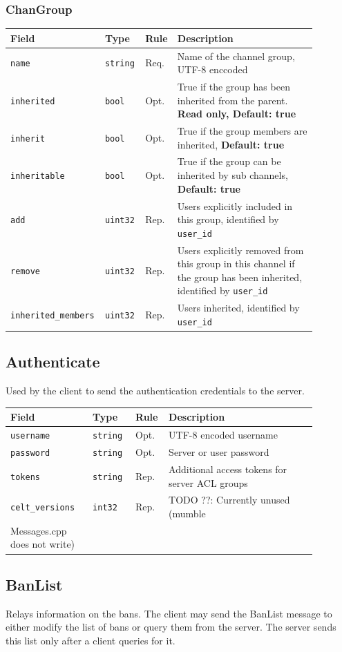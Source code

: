 \documentclass[11pt]{article} %
\newenvironment{mumbleMessageEx}
{%
	\small
	\renewcommand\arraystretch{1.5}
	\begin{tabular}{p{0.25\linewidth}p{0.13\linewidth}p{0.05\linewidth}p{0.45\linewidth}}
	Field & Type & Rule & Description \\
	\hline
}
{%
	\end{tabular}
	\renewcommand\arraystretch{1.0}
}
\newcommand{\mumbleMessageExItem}[4]{ \texttt{#1} & \texttt{#2} & #3 & #4 \\ }
\begin{document}
\subsubsection{ChanGroup}
\label{msg:chanGroup}

\begin{mumbleMessageEx}
\mumbleMessageExItem{name}{string}{Req.}{Name of the channel group, UTF-8 enccoded}
\mumbleMessageExItem{inherited}{bool}{Opt.}{True if the group has been inherited from the parent. \textbf{Read only, Default: true}}
\mumbleMessageExItem{inherit}{bool}{Opt.}{True if the group members are inherited, \textbf{Default: true}}
\mumbleMessageExItem{inheritable}{bool}{Opt.}{True if the group can be inherited by sub channels, \textbf{Default: true}}
\mumbleMessageExItem{add}{uint32}{Rep.}{Users explicitly included in this group, identified by \texttt{user\_id}}
\mumbleMessageExItem{remove}{uint32}{Rep.}{Users explicitly removed from this group in this channel if the group has been inherited, identified by \texttt{user\_id}}
\mumbleMessageExItem{inherited\_members}{uint32}{Rep.}{Users inherited, identified by \texttt{user\_id}}
\end{mumbleMessageEx}


\subsection{Authenticate}
\label{msg:authenticate}

Used by the client to send the authentication credentials to the server.

\begin{mumbleMessageEx}
\mumbleMessageExItem{username}{string}{Opt.}{UTF-8 encoded username}
\mumbleMessageExItem{password}{string}{Opt.}{Server or user password}
\mumbleMessageExItem{tokens}{string}{Rep.}{Additional access tokens for server ACL groups}
\mumbleMessageExItem{celt\_versions}{int32}{Rep.}{TODO ??: Currently unused (mumble\\Messages.cpp does not write)}
\end{mumbleMessageEx}

\subsection{BanList} 
\label{msg:banList}

Relays information on the bans. The client may send the BanList message to either modify the list of bans or query them from the server. The server sends this list only after a client queries for it.
\end{document}
